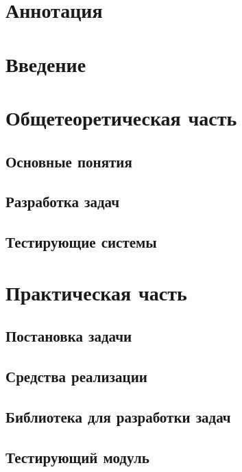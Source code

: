 



\chapter*{Аннотация}


\renewcommand{\contentsname}{Содержание}
\tableofcontents

\chapter*{Введение}


\chapter{Общетеоретическая часть}
\section{Основные понятия}

\section{Разработка задач}

\section{Тестирующие системы}


\chapter{Практическая часть}
\section{Постановка задачи}

\section{Средства реализации}

\section{Библиотека для разработки задач}

\section{Тестирующий модуль}

